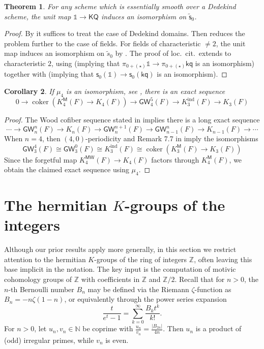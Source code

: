 \documentclass[11pt,hyp,english]{article}
\newcommand{\Z}{\mathbb{Z}}
\newcommand{\N}{\mathbb{N}}
\newcommand{\unit}{\mathds{1}}
\newcommand{\KQ}{\mathsf{KQ}}
\newcommand{\kq}{\mathsf{kq}}
\newcommand{\GW}{\mathsf{GW}}
\newcommand{\coker}{\operatorname{coker}}
\newcommand{\s}{\mathsf{s}}
\newcommand{\vs}{\tilde{\mathsf{s}}}
\newcommand{\MW}{{\mathsf{MW}}}
\newcommand{\sfM}{{\mathsf{M}}}
\newcommand{\bideg}{(\star)}
\newtheorem{theorem}{Theorem}[section]
\newtheorem{corollary}[theorem]{Corollary}
\theoremstyle{definition}
\begin{document}
\begin{theorem}\label{thm:unit-vs0-iso}
For any scheme which is essentially smooth over a Dedekind scheme, the unit map $\unit\to \KQ$ induces an isomorphism on $\vs_0$.
\end{theorem}

\begin{proof}
By \cite[Lemma~B.1]{bachmann-hoyois} it suffices to treat the case of Dedekind domains.  
Then \cite[Prop.~B.3]{bachmann-hoyois} reduces the problem further to the case of fields.  
For fields of characteristic $\neq 2$, the unit map induces an isomorphism on $\tilde{s}_{0}$ by \cite[Theorem~3.30]{2020arXiv200506778B}.  
The proof of loc.~cit.~extends to characteristic $2$, using  (implying that $\pi_{0+\bideg}\unit\to \pi_{0+\bideg}\kq$ is an isomorphism) together with  (implying that $\s_{0}(\unit)\to \s_{0}(\kq)$ is an isomorphism).
 \end{proof}

\begin{corollary}
If $\mu_4$ is an isomorphism, 
see , 
there is an exact sequence
\[
0\to \coker (K_4^{\sfM}(F)\rightarrow K_4(F))\to 
\GW_4^{5}(F)\to K_3^{\mathrm{ind}}(F)\to K_3(F)
\]
\end{corollary}
\begin{proof}
The Wood cofiber sequence stated in  implies there is a long exact sequence
\[
\cdots\to \GW_n^{n}(F)\rightarrow K_n(F)\to \GW_n^{n+1}(F)\to 
\GW_{n-1}^{n}(F)\rightarrow K_{n-1}(F)\to\cdots
\]
When $n=4$, 
then $(4,0)$-periodicity and Remark 7.7 in \cite{RO:slices} imply 
the isomorphisms
\[
\GW_3^{4}(F)\cong \GW_3^{0}(F)\cong K_3^{\mathrm{ind}}(F)\cong 
\coker(K_3^{\sfM}(F)\rightarrow K_3(F))
\]
Since the forgetful map $K_4^\MW(F)\to K_4(F)$
factors through $K_4^{\sfM}(F)$, 
we obtain the claimed exact sequence using $\mu_4$.
\end{proof}





\section{The hermitian $K$-groups of the integers}
\label{section:hkgoti}

Although our prior results apply more generally, 
in this section we restrict attention to the hermitian $K$-groups of the ring of integers $\Z$, 
often leaving this base implicit in the notation.  
The key input is the computation of motivic cohomology groups of $\Z$ with coefficients in $\Z$ and $\Z/2$.  
Recall that for $n>0$, the $n$-th Bernoulli number $B_n$ may be defined via the Riemann $\zeta$-function as $B_n=-n\zeta(1-n)$, or equivalently through the power series expansion
\[
\frac{t}{e^t-1} = \sum_{k=0}^\infty \frac{B_k t^k}{k!}.
\]
For $n>0$, let $u_n,v_n\in\N$ be coprime with $\frac{u_n}{v_n}=\frac{|B_{2n}|}{4n}$.  
Then $u_n$ is a product of (odd) irregular primes, while $v_n$ is even.
\end{document}
